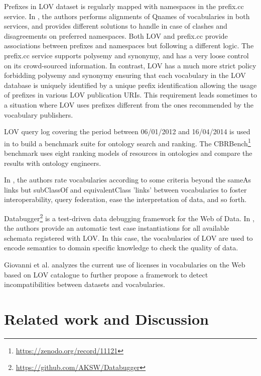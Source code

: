 \documentclass{iosart2c}
\newcommand{\ghis}[1]{\textcolor{brown}{\textbf{[GHIS TO:#1]}}}
\begin{document}
Prefixes in LOV dataset is regularly mapped with namespaces in the prefix.cc service. In \cite{wasabi13}, the authors performs alignments of Qnames of vocabularies in both services, and provides different solutions to handle in case of clashes and disagreements on preferred namespaces. Both LOV and prefix.cc provide associations between prefixes and namespaces but following a different logic. The prefix.cc service supports polysemy and synonymy, and has a very loose control on its crowd-sourced information. In contrast, LOV has a much more strict policy forbidding polysemy and synonymy ensuring that each vocabulary in the LOV database is uniquely identified by a unique prefix identification allowing the usage of prefixes in various LOV publication URIs. This requirement leads sometimes to a situation where LOV uses prefixes different from the ones recommended by the vocabulary publishers.

LOV query log covering the period between 06/01/2012 and 16/04/2014 is used in \cite{butt2014} to build a benchmark suite for ontology search and ranking. The CBRBench\footnote{\url{https://zenodo.org/record/11121}} benchmark uses eight ranking models of resources in ontologies and compare the results with ontology engineers.

In \cite{janowicz2014five}, the authors rate vocabularies according to some criteria beyond the sameAs links but subClassOf and equivalentClass 'links' between vocabularies to foster interoperability, query federation, ease the interpretation of data, and so forth. %

Databugger\footnote{\url{https://github.com/AKSW/Databugger}} is a test-driven data debugging framework for the Web of Data. In \cite{databugger,rdfunit}, the authors provide an automatic test case instantiations for all available schemata registered with LOV. In this case, the vocabularies of LOV are used to encode semantics to domain specific knowledge to check the quality of data.

Giovanni et al. \cite{governatori2014} analyzes the current use of licenses in vocabularies on the Web based on LOV catalogue to further propose a framework to detect incompatibilities between datasets and vocabularies.


\section{Related work and Discussion}
\label{sec:related}
\end{document}
